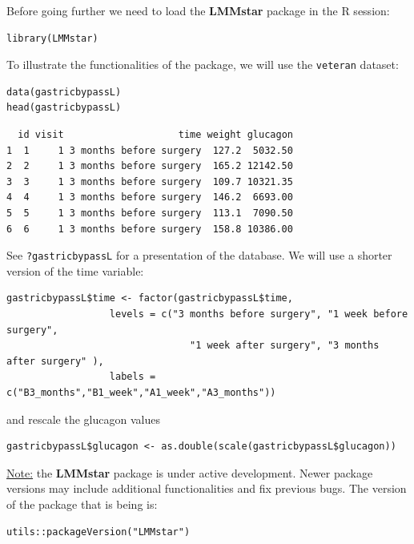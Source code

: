 \documentclass[12pt]{article}
\begin{document}
\clearpage

Before going further we need to load the \textbf{LMMstar} package in the R
session:
\lstset{language=r,label= ,caption= ,captionpos=b,numbers=none}
\begin{lstlisting}
library(LMMstar)
\end{lstlisting}

To illustrate the functionalities of the package, we will use the
\texttt{veteran} dataset:
\lstset{language=r,label= ,caption= ,captionpos=b,numbers=none}
\begin{lstlisting}
data(gastricbypassL)
head(gastricbypassL)
\end{lstlisting}

\begin{verbatim}
  id visit                    time weight glucagon
1  1     1 3 months before surgery  127.2  5032.50
2  2     1 3 months before surgery  165.2 12142.50
3  3     1 3 months before surgery  109.7 10321.35
4  4     1 3 months before surgery  146.2  6693.00
5  5     1 3 months before surgery  113.1  7090.50
6  6     1 3 months before surgery  158.8 10386.00
\end{verbatim}


See \texttt{?gastricbypassL} for a presentation of the database. We will use a shorter version of the time variable:
\lstset{language=r,label= ,caption= ,captionpos=b,numbers=none}
\begin{lstlisting}
gastricbypassL$time <- factor(gastricbypassL$time,
			      levels = c("3 months before surgery", "1 week before surgery",
							    "1 week after surgery", "3 months after surgery" ),
			      labels = c("B3_months","B1_week","A1_week","A3_months"))
\end{lstlisting}
and rescale the glucagon values
\lstset{language=r,label= ,caption= ,captionpos=b,numbers=none}
\begin{lstlisting}
gastricbypassL$glucagon <- as.double(scale(gastricbypassL$glucagon))
\end{lstlisting}

\bigskip

\uline{Note:} the \textbf{LMMstar} package is under active development. Newer
package versions may include additional functionalities and fix
previous bugs. The version of the package that is being is:
\lstset{language=r,label= ,caption= ,captionpos=b,numbers=none}
\begin{lstlisting}
utils::packageVersion("LMMstar")
\end{lstlisting}
\end{document}
